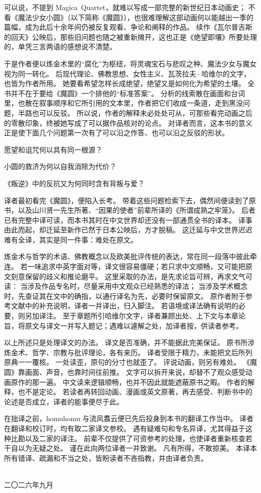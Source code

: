 
可以说，不提到 \mbox{Magica Quartet}，就难以写成一部完整的新世纪日本动画史；
不看《魔法少女小圆》（以下简称《魔圆》），也很难理解这部动画何以能越出一季的篇幅，成为此后十余年间仍被反复观看、争论和阐释的作品。
续作《瓦尔普吉斯的回天》公映后，那些旧问题也随之被重新摊开，这也正是《绝望即壤》所要处理的，单凭三言两语的感想说不清楚。

于是作者便以炼金术里的“腐化”为枢纽，将灵魂宝石与悲叹之种、魔法少女与魔女视为同一转化。
后现代理论、佛教思想、女性主义、瓦茨拉夫·哈维尔的文字，也皆为作者所用。
她要看希望怎样长成绝望，绝望又是如何化为希望的土壤。
全书并不在于要给《魔圆》一个排他的“标准答案”。
分析的线索散在画面和台词里，也散在叙事顺序和它所引用的文本里，作者把它们收成一条道，走到黑没问题，半路也可以反驳。
所以说，作者的解释未必处处可从，可那些看完动画之后的零散印象，终被她写成了可以据作品核对的论点。
对译者而言，这本书的意义正是使下面几个问题第一次有了可以沿之作答、也可以沿之反驳的形状。

愿望和诅咒何以具有同一根源？

小圆的救济为何以自我消除为代价？

《叛逆》中的反抗又为何同时含有背叛与爱？

译者最初看完《魔圆》，便陷入长考。
带着这些问题检索下去，偶然间便读到了原书，以及山川贤一先生所著、“因果的使者”前辈所译的《所谓成熟之牢笼》。
后者已有完整中译可读，而本书其时在中文世界却还没有一部通贯全书的译本。
译事由此而起，却迁延至新作已然于日本公映后，方才脱稿。
这迁延与中文世界迟迟难有全译，其实是同一件事：难处在原文。

炼金术与哲学的术语、佛教概念以及欧美批评传统的表达，常在同一段落中彼此牵连。
若一味追求中英字面对等，译文很容易僵硬；若只求中文顺畅，又可能把原文刻意保留的歧义和推论磨平。
这里采取的办法，是先求论旨可辨，再求文气可读：
当涉及作品专名时，尽量采用中文观众已经熟悉的译法；
当涉及学术概念时，先查证其在文中的确指，以通行译名为先，必要时保留原文。
原作者附于参考文献中的补充说明，译者一并译出，归入脚注。
若语境或译法确有说明的必要，则另加译注。
至于章题所引哈维尔文字，译者兼顾出处、上下文与本章论旨，将原文与译文一并写入题记；遇难以遽解之处，加译者按，供读者参考。

以上所述只是处理译文的办法。
译文是否准确，并不能据此完美保证。
原书所涉炼金术、哲学、宗教与批评理论，各有来历。
译者受限于精力，未能把文后所列原典一一覆核。
一处读歪，原句的分寸也就歪了。
评说动画，则另有难处。
《魔圆》靠画面、声音，也靠时间往前推。
文字可以拆开来说，却替不了观众感受动画原作的那一遍。
中文读来逻辑顺畅，也并不因此就能遮蔽原书之暇。
作者的解释，也不是定论。
若读者再转回动画、漫画或英文原著，再去感受、判断书中的论述是否成立，译者的能事便尽于此。

在拙译之前，\mbox{homuhomu} 与流风翥云便已先后投身到本书的翻译工作当中。
译者在翻译和校订时，均有取二家译文参校。
遇有疑难句和专名异译，尤其得益于这种比勘以及二家的译注。
前辈不仅提供了可资参考的处理，也使译者重新核查若干自以为无疑之处。
谨在此向两位译者一并致谢。
凡有所得，不敢掠美。
本译本所有错译、疏漏和不当之处，皆盼读者不吝指教，并由译者负责。

\begin{flushright}
  \BookTranslator\\
  二〇二六年九月
  
\end{flushright}
